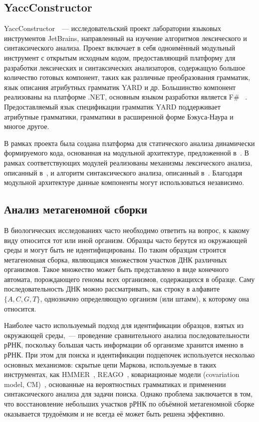 \subsection{YaccConstructor}
YaccConstructor~\cite{YCUrl}~--- исследовательский проект лаборатории языковых инструментов JetBrains, направленный на изучение алгоритмов лексического и синтаксического анализа. Проект включает в себя одноимённый модульный инструмент с открытым исходным кодом, предоставляющий платформу для разработки лексических и синтаксических анализаторов, содержащую большое количество готовых компонент, таких как различные преобразования грамматик, язык описания атрибутных грамматик YARD и др. Большинство компонент реализованы на платформе .NET, основным языком разработки является F\# ~\cite{FSharp}. Предоставляемый язык спецификации грамматик YARD поддерживает атрибутные грамматики, грамматики в расширенной форме Бэкуса-Наура и многое другое.

В рамках проекта была создана платформа для статического анализа динамически формируемого кода, основанная на модульной архитектуре, предложенной в~\cite{GrigorievPhd}. В рамках соответствующих модулей реализованы механизмы лексического анализа, описанный в~\cite{polubelova}, и алгоритм синтаксического анализа, описанный в~\cite{RelaxedARNGLR}. Благодаря модульной архитектуре данные компоненты могут использоваться независимо. 

\subsection{Анализ метагеномной сборки}
В биологических исследованиях часто необходимо ответить на вопрос, к какому виду относится тот или иной организм. Образцы часто берутся из окружающей среды и могут быть не идентифицированы. По таким образцам строится метагеномная сборка, являющаяся множеством участков ДНК различных организмов. Такое множество может быть представлено в виде конечного автомата, порождающего геномы всех организмов, содержащихся в образце. Саму последовательность ДНК можно рассматривать, как строку в алфавите $\{A, C, G, T\}$, однозначно определяющую организм (или штамм), к которому она относится. 

Наиболее часто используемый подход для идентификации образцов, взятых из окружающей среды,~--- проведение сравнительного анализа последовательности рРНК, поскольку большая часть информации об организме хранится именно в рРНК. При этом для поиска и идентификации подцепочек используется несколько основных механизмов: скрытые цепи Маркова, используемые в таких инструментах, как HMMER~\cite{hmmer}, REAGO~\cite{reago}, ковариационые модели (covariation model, CM)~\cite{durbin}, основанные на вероятностных грамматиках и применении синтаксического анализа для задачи поиска. Однако проблема заключается в том, что восстановление небольших участков рРНК по объёмной метагеномной сборке оказывается трудоёмким и не всегда её может быть решена эффективно. 


